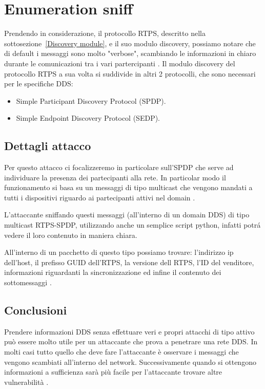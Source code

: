 \section{Enumeration sniff}
Prendendo in considerazione, il protocollo RTPS,
descritto nella sottosezione~\ref{Discovery module}, e il suo modulo discovery,
possiamo notare che di default i messaggi sono molto "verbose", 
scambiando le informazioni in
chiaro durante le comunicazioni tra i vari partercipanti \cite{White2017AnII}.
Il modulo 
discovery del protocollo RTPS a sua volta si suddivide in
altri 2 protocolli, che sono necessari per le specifiche DDS:
\begin{itemize}
    \item Simple Participant Discovery Protocol (SPDP).
    \item Simple Endpoint Discovery Protocol (SEDP).
\end{itemize}



\subsection{Dettagli attacco}
Per questo attacco ci focalizzeremo in particolare sull'SPDP che serve ad
individuare la presenza dei partecipanti alla rete. In particolar modo
il funzionamento si basa su un messaggi di tipo multicast che vengono
mandati a tutti i dispositivi riguardo ai partecipanti attivi 
nel domain
\cite{ddsrtps}.

L'attaccante sniffando questi messaggi (all'interno di un domain DDS)
di tipo multicast RTPS-SPDP,
utilizzando anche un semplice script python, infatti potrá 
vedere il loro contenuto in maniera chiara.

All'interno di un pacchetto di questo tipo possiamo trovare:
l'indirizzo ip dell'host, il prefisso GUID dell'RTPS,
la versione dell RTPS, l'ID del venditore, informazioni riguardanti la sincronizzazione
ed infine il contenuto dei sottomessaggi \cite{White2017AnII}.


\subsection{Conclusioni}
Prendere informazioni DDS senza effettuare veri e propri
attacchi di tipo attivo può essere molto utile per un attaccante che prova
a penetrare una rete DDS. In molti casi tutto quello che deve fare l'attaccante
è osservare i messaggi che vengono scambiati all'interno del network.
Successivamente quando si ottengono informazioni a sufficienza sarà più
facile per l'attaccante trovare altre vulnerabilità
\cite{White2017AnII}.

